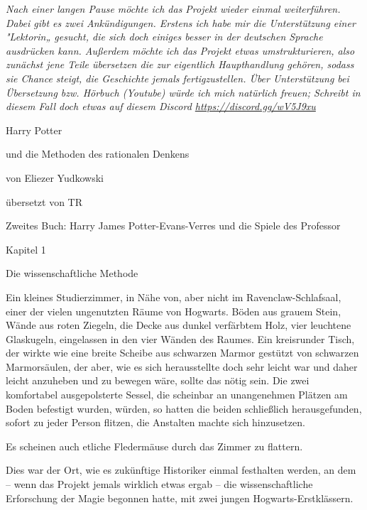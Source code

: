

\hypertarget{die-wissenschaftliche-methode}{%

\emph{Nach einer langen Pause möchte ich das Projekt wieder einmal weiterführen. Dabei gibt es zwei Ankündigungen. Erstens ich habe mir die Unterstützung einer "Lektorin„ gesucht, die sich doch einiges besser in der deutschen Sprache ausdrücken kann. Außerdem möchte ich das Projekt etwas umstrukturieren, also zunächst jene Teile übersetzen die zur eigentlich Haupthandlung gehören, sodass sie Chance steigt, die Geschichte jemals fertigzustellen. Über Unterstützung bei Übersetzung bzw. Hörbuch (Youtube) würde ich mich natürlich freuen; Schreibt in diesem Fall doch etwas auf diesem Discord \url{https://discord.gg/wV5J9xu} ~}

Harry Potter

und die Methoden des rationalen Denkens

von Eliezer Yudkowski

übersetzt von TR

Zweites Buch: Harry James Potter-Evans-Verres und die Spiele des Professor

Kapitel 1

Die wissenschaftliche Methode

Ein kleines Studierzimmer, in Nähe von, aber nicht im Ravenclaw-Schlafsaal, einer der vielen ungenutzten Räume von Hogwarts. Böden aus grauem Stein, Wände aus roten Ziegeln, die Decke aus dunkel verfärbtem Holz, vier leuchtene Glaskugeln, eingelassen in den vier Wänden des Raumes. Ein kreisrunder Tisch, der wirkte wie eine breite Scheibe aus schwarzen Marmor gestützt von schwarzen Marmorsäulen, der aber, wie es sich herausstellte doch sehr leicht war und daher leicht anzuheben und zu bewegen wäre, sollte das nötig sein. Die zwei komfortabel ausgepolsterte Sessel, die scheinbar an unangenehmen Plätzen am Boden befestigt wurden, würden, so hatten die beiden schließlich herausgefunden, sofort zu jeder Person flitzen, die Anstalten machte sich hinzusetzen.

Es scheinen auch etliche Fledermäuse durch das Zimmer zu flattern.

Dies war der Ort, wie es zukünftige Historiker einmal festhalten werden, an dem -- wenn das Projekt jemals wirklich etwas ergab -- die wissenschaftliche Erforschung der Magie begonnen hatte, mit zwei jungen Hogwarts-Erstklässern.

}
